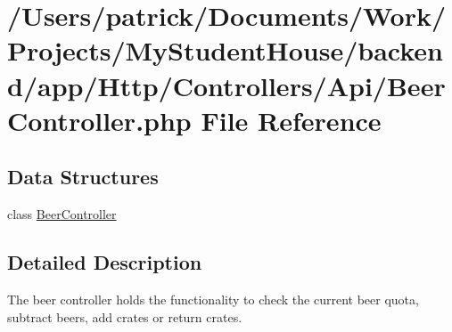 \hypertarget{_beer_controller_8php}{}\section{/\+Users/patrick/\+Documents/\+Work/\+Projects/\+My\+Student\+House/backend/app/\+Http/\+Controllers/\+Api/\+Beer\+Controller.php File Reference}
\label{_beer_controller_8php}
\subsection*{Data Structures}
\begin{DoxyCompactItemize}
\item 
class \mbox{\hyperlink{class_app_1_1_http_1_1_controllers_1_1_a_p_i_1_1_beer_controller}{Beer\+Controller}}
\end{DoxyCompactItemize}


\subsection{Detailed Description}
The beer controller holds the functionality to check the current beer quota, subtract beers, add crates or return crates. 